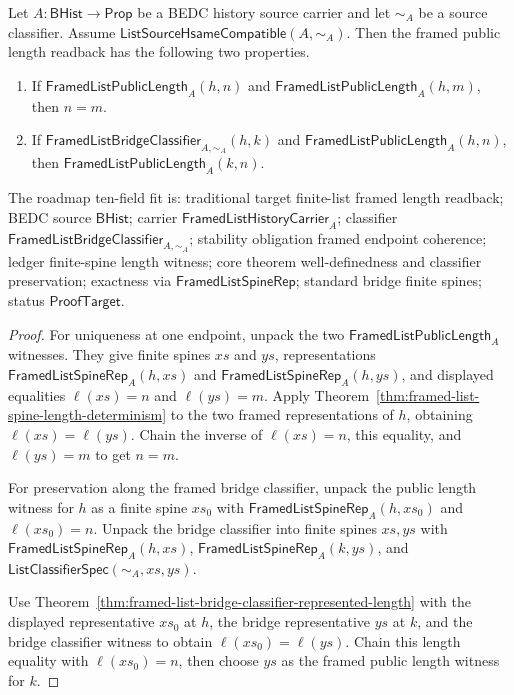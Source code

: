\begin{theorem}
\label{thm:framed-list-public-length-readback-well-defined}
Let $A:\mathsf{BHist}\to\mathsf{Prop}$ be a BEDC history source carrier and let
$\sim_A$ be a source classifier. Assume
$\mathsf{ListSourceHsameCompatible}(A,\sim_A)$. Then the framed public length
readback has the following two properties.
\begin{enumerate}
  \item If $\mathsf{FramedListPublicLength}_A(h,n)$ and
  $\mathsf{FramedListPublicLength}_A(h,m)$, then $n=m$.
  \item If $\mathsf{FramedListBridgeClassifier}_{A,\sim_A}(h,k)$ and
  $\mathsf{FramedListPublicLength}_A(h,n)$, then
  $\mathsf{FramedListPublicLength}_A(k,n)$.
\end{enumerate}
The roadmap ten-field fit is: traditional target finite-list framed length
readback; BEDC source $\mathsf{BHist}$; carrier
$\mathsf{FramedListHistoryCarrier}_A$; classifier
$\mathsf{FramedListBridgeClassifier}_{A,\sim_A}$; stability obligation framed
endpoint coherence; ledger finite-spine length witness; core theorem
well-definedness and classifier preservation; exactness via
$\mathsf{FramedListSpineRep}$; standard bridge finite spines; status
$\mathsf{ProofTarget}$.
\end{theorem}
\begin{proof}
For uniqueness at one endpoint, unpack the two
$\mathsf{FramedListPublicLength}_A$ witnesses. They give finite spines $xs$ and
$ys$, representations $\mathsf{FramedListSpineRep}_A(h,xs)$ and
$\mathsf{FramedListSpineRep}_A(h,ys)$, and displayed equalities
$\ell(xs)=n$ and $\ell(ys)=m$. Apply
Theorem~\ref{thm:framed-list-spine-length-determinism} to the two framed
representations of $h$, obtaining $\ell(xs)=\ell(ys)$. Chain the inverse of
$\ell(xs)=n$, this equality, and $\ell(ys)=m$ to get $n=m$.

For preservation along the framed bridge classifier, unpack the public length
witness for $h$ as a finite spine $xs_0$ with
$\mathsf{FramedListSpineRep}_A(h,xs_0)$ and $\ell(xs_0)=n$. Unpack the bridge
classifier into finite spines $xs,ys$ with
$\mathsf{FramedListSpineRep}_A(h,xs)$,
$\mathsf{FramedListSpineRep}_A(k,ys)$, and
$\mathsf{ListClassifierSpec}(\sim_A,xs,ys)$.

Use Theorem~\ref{thm:framed-list-bridge-classifier-represented-length} with the
displayed representative $xs_0$ at $h$, the bridge representative $ys$ at $k$,
and the bridge classifier witness to obtain $\ell(xs_0)=\ell(ys)$. Chain this
length equality with $\ell(xs_0)=n$, then choose $ys$ as the framed public length
witness for $k$.
\end{proof}

